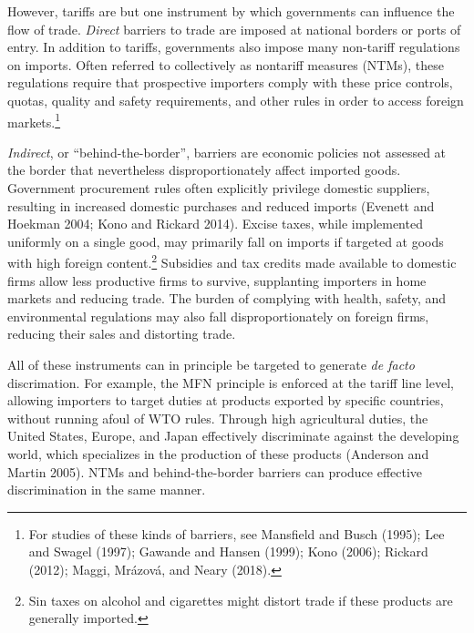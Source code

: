 \documentclass{puthesis}
\begin{document}
However, tariffs are but one instrument by which governments can
influence the flow of trade. \emph{Direct} barriers to trade are imposed
at national borders or ports of entry. In addition to tariffs,
governments also impose many non-tariff regulations on imports. Often
referred to collectively as nontariff measures (NTMs), these regulations
require that prospective importers comply with these price controls,
quotas, quality and safety requirements, and other rules in order to
access foreign markets.\footnote{For studies of these kinds of barriers,
  see Mansfield and Busch (1995); Lee and Swagel (1997); Gawande and
  Hansen (1999); Kono (2006); Rickard (2012); Maggi, Mrázová, and Neary
  (2018).}

\emph{Indirect}, or ``behind-the-border'', barriers are economic
policies not assessed at the border that nevertheless disproportionately
affect imported goods. Government procurement rules often explicitly
privilege domestic suppliers, resulting in increased domestic purchases
and reduced imports (Evenett and Hoekman 2004; Kono and Rickard 2014).
Excise taxes, while implemented uniformly on a single good, may
primarily fall on imports if targeted at goods with high foreign
content.\footnote{Sin taxes on alcohol and cigarettes might distort
  trade if these products are generally imported.} Subsidies and tax
credits made available to domestic firms allow less productive firms to
survive, supplanting importers in home markets and reducing trade. The
burden of complying with health, safety, and environmental regulations
may also fall disproportionately on foreign firms, reducing their sales
and distorting trade.

All of these instruments can in principle be targeted to generate
\emph{de facto} discrimation. For example, the MFN principle is enforced
at the tariff line level, allowing importers to target duties at
products exported by specific countries, without running afoul of WTO
rules. Through high agricultural duties, the United States, Europe, and
Japan effectively discriminate against the developing world, which
specializes in the production of these products (Anderson and Martin
2005). NTMs and behind-the-border barriers can produce effective
discrimination in the same manner.
\end{document}
